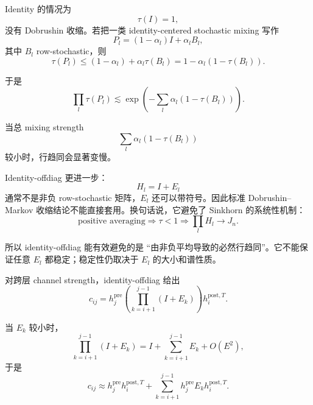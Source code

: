 \documentclass[UTF8,11pt]{ctexart}
\newcommand{\J}{J_n}
\begin{document}
Identity 的情况为
\begin{equation}
  \tau(I)=1,
\end{equation}
没有 Dobrushin 收缩。若把一类 identity-centered stochastic mixing 写作
\begin{equation}
  P_l=(1-\alpha_l)I+\alpha_l B_l,
\end{equation}
其中 $B_l$ row-stochastic，则
\begin{equation}
  \tau(P_l)
  \le
  (1-\alpha_l)+\alpha_l\tau(B_l)
  =
  1-\alpha_l(1-\tau(B_l)).
\end{equation}

于是
\begin{equation}
  \prod_l \tau(P_l)
  \lesssim
  \exp\left(
  -\sum_l\alpha_l(1-\tau(B_l))
  \right).
\end{equation}

当总 mixing strength
\begin{equation}
  \sum_l\alpha_l(1-\tau(B_l))
\end{equation}
较小时，行趋同会显著变慢。

Identity-offdiag 更进一步：
\begin{equation}
  H_l=I+E_l
\end{equation}
通常不是非负 row-stochastic 矩阵，$E_l$ 还可以带符号。因此标准 Dobrushin--Markov 收缩结论不能直接套用。换句话说，它避免了 Sinkhorn 的系统性机制：
\begin{equation}
  \text{positive averaging}
  \Rightarrow
  \tau<1
  \Rightarrow
  \prod_l H_l \to \J.
\end{equation}

所以 identity-offdiag 能有效避免的是 ``由非负平均导致的必然行趋同''。它不能保证任意 $E_l$ 都稳定；稳定性仍取决于 $E_l$ 的大小和谱性质。

对跨层 channel strength，identity-offdiag 给出
\begin{equation}
  c_{ij}
  =
  h_j^{\mathrm{pre}}
  \left(\prod_{k=i+1}^{j-1}(I+E_k)\right)
  h_i^{\mathrm{post},T}.
\end{equation}

当 $E_k$ 较小时，
\begin{equation}
  \prod_{k=i+1}^{j-1}(I+E_k)
  =
  I+
  \sum_{k=i+1}^{j-1}E_k
  +O(E^2),
\end{equation}
于是
\begin{equation}
  c_{ij}
  \approx
  h_j^{\mathrm{pre}}h_i^{\mathrm{post},T}
  +
  \sum_{k=i+1}^{j-1}
  h_j^{\mathrm{pre}}E_kh_i^{\mathrm{post},T}.
\end{equation}
\end{document}
